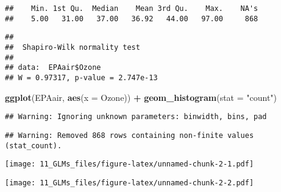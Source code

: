 \documentclass[]{article}
\newenvironment{Shaded}{\begin{snugshade}}{\end{snugshade}}
\newcommand{\KeywordTok}[1]{\textcolor[rgb]{0.13,0.29,0.53}{\textbf{#1}}}
\newcommand{\DataTypeTok}[1]{\textcolor[rgb]{0.13,0.29,0.53}{#1}}
\newcommand{\StringTok}[1]{\textcolor[rgb]{0.31,0.60,0.02}{#1}}
\newcommand{\CommentTok}[1]{\textcolor[rgb]{0.56,0.35,0.01}{\textit{#1}}}
\newcommand{\OperatorTok}[1]{\textcolor[rgb]{0.81,0.36,0.00}{\textbf{#1}}}
\newcommand{\NormalTok}[1]{#1}
\begin{document}
\begin{verbatim}
##    Min. 1st Qu.  Median    Mean 3rd Qu.    Max.    NA's 
##    5.00   31.00   37.00   36.92   44.00   97.00     868
\end{verbatim}

\begin{Shaded}
\end{Shaded}

\begin{verbatim}
## 
##  Shapiro-Wilk normality test
## 
## data:  EPAair$Ozone
## W = 0.97317, p-value = 2.747e-13
\end{verbatim}

\begin{Shaded}
\begin{Highlighting}[]
\KeywordTok{ggplot}\NormalTok{(EPAair, }\KeywordTok{aes}\NormalTok{(}\DataTypeTok{x =}\NormalTok{ Ozone)) }\OperatorTok{+}
\StringTok{  }\KeywordTok{geom_histogram}\NormalTok{(}\DataTypeTok{stat =} \StringTok{"count"}\NormalTok{)}
\end{Highlighting}
\end{Shaded}

\begin{verbatim}
## Warning: Ignoring unknown parameters: binwidth, bins, pad
\end{verbatim}

\begin{verbatim}
## Warning: Removed 868 rows containing non-finite values (stat_count).
\end{verbatim}

\texttt{[image: 11\_GLMs\_files/figure-latex/unnamed-chunk-2-1.pdf]}

\begin{Shaded}
\end{Shaded}

\texttt{[image: 11\_GLMs\_files/figure-latex/unnamed-chunk-2-2.pdf]}
\end{document}
